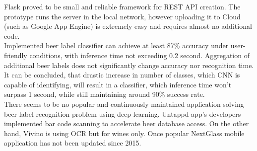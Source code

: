 \documentclass[11pt]{article}
\begin{document}
Flask proved to be small and reliable framework for REST API creation. The prototype runs the server in the local network, however uploading it to Cloud (such as Google App Engine) is extremely easy and requires almost no additional code. \\

Implemented beer label classifier can achieve at least 87\% accuracy under user-friendly conditions, with inference time not exceeding 0.2 second. Aggregation of additional beer labels does not significantly change accuracy nor recognition time. It can be concluded, that drastic increase in number of classes, which CNN is capable of identifying, will result in a classifier, which inference time won't surpass 1 second, while still maintaining around 90\% success rate. \\

There seems to be no popular and continuously maintained application solving beer label recognition problem using deep learning. Untappd app's developers implemented bar code scanning to accelerate beer database access. On the other hand, Vivino is using OCR but for wines only. Once popular NextGlass mobile application has not been updated since 2015. 
\clearpage



\end{document}
